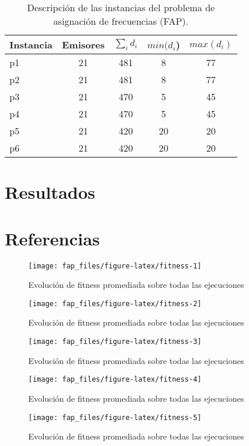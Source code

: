 \documentclass[
  11pt,
  a4paper,
]{article}
\begin{document}
\begin{table}[ht]
\centering
\caption{Descripción de las instancias del problema de asignación de frecuencias (FAP).}
\label{tab:fap-instances}
\begin{tabular}{lcccc}
\hline
\textbf{Instancia} & \textbf{Emisores} & \textbf{$\sum_{i} d_{i}$} & \textbf{$min(d_{i}$)} & \textbf{$max(d_{i})$} \\
\hline
p1 & 21 & 481 & 8  & 77 \\
p2 & 21 & 481 & 8  & 77 \\
p3 & 21 & 470 & 5  & 45 \\
p4 & 21 & 470 & 5  & 45 \\
p5 & 21 & 420 & 20 & 20 \\
p6 & 21 & 420 & 20 & 20 \\
\hline
\end{tabular}
\end{table}

\section{Resultados}\label{resultados}

\section{Referencias}\label{referencias}

\begin{figure}
\texttt{[image: fap\_files/figure-latex/fitness-1]} \caption{Evoluci\'on de fitness promediada sobre todas las ejecuciones}\label{fig:fitness-1}
\end{figure}
\begin{figure}
\texttt{[image: fap\_files/figure-latex/fitness-2]} \caption{Evoluci\'on de fitness promediada sobre todas las ejecuciones}\label{fig:fitness-2}
\end{figure}
\begin{figure}
\texttt{[image: fap\_files/figure-latex/fitness-3]} \caption{Evoluci\'on de fitness promediada sobre todas las ejecuciones}\label{fig:fitness-3}
\end{figure}
\begin{figure}
\texttt{[image: fap\_files/figure-latex/fitness-4]} \caption{Evoluci\'on de fitness promediada sobre todas las ejecuciones}\label{fig:fitness-4}
\end{figure}
\begin{figure}
\texttt{[image: fap\_files/figure-latex/fitness-5]} \caption{Evoluci\'on de fitness promediada sobre todas las ejecuciones}\label{fig:fitness-5}
\end{figure}
\end{document}
